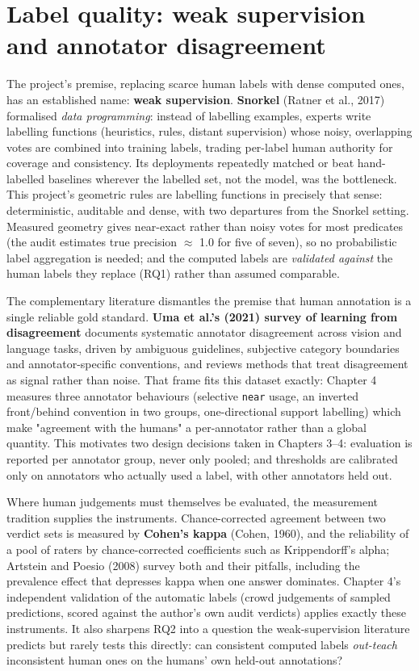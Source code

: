 \section{Label quality: weak supervision and annotator disagreement}

The project's premise, replacing scarce human labels with dense computed ones, has an established name: \textbf{weak supervision}. \textbf{Snorkel} (Ratner et al., 2017) formalised \textit{data programming}: instead of labelling examples, experts write labelling functions (heuristics, rules, distant supervision) whose noisy, overlapping votes are combined into training labels, trading per-label human authority for coverage and consistency. Its deployments repeatedly matched or beat hand-labelled baselines wherever the labelled set, not the model, was the bottleneck. This project's geometric rules are labelling functions in precisely that sense: deterministic, auditable and dense, with two departures from the Snorkel setting. Measured geometry gives near-exact rather than noisy votes for most predicates (the audit estimates true precision $\approx$ 1.0 for five of seven), so no probabilistic label aggregation is needed; and the computed labels are \textit{validated against} the human labels they replace (RQ1) rather than assumed comparable.

The complementary literature dismantles the premise that human annotation is a single reliable gold standard. \textbf{Uma et al.'s (2021) survey of learning from disagreement} documents systematic annotator disagreement across vision and language tasks, driven by ambiguous guidelines, subjective category boundaries and annotator-specific conventions, and reviews methods that treat disagreement as signal rather than noise. That frame fits this dataset exactly: Chapter 4 measures three annotator behaviours (selective \texttt{near} usage, an inverted front/behind convention in two groups, one-directional support labelling) which make "agreement with the humans" a per-annotator rather than a global quantity. This motivates two design decisions taken in Chapters 3--4: evaluation is reported per annotator group, never only pooled; and thresholds are calibrated only on annotators who actually used a label, with other annotators held out.

Where human judgements must themselves be evaluated, the measurement tradition supplies the instruments. Chance-corrected agreement between two verdict sets is measured by \textbf{Cohen's kappa} (Cohen, 1960), and the reliability of a pool of raters by chance-corrected coefficients such as Krippendorff's alpha; Artstein and Poesio (2008) survey both and their pitfalls, including the prevalence effect that depresses kappa when one answer dominates. Chapter 4's independent validation of the automatic labels (crowd judgements of sampled predictions, scored against the author's own audit verdicts) applies exactly these instruments. It also sharpens RQ2 into a question the weak-supervision literature predicts but rarely tests this directly: can consistent computed labels \textit{out-teach} inconsistent human ones on the humans' own held-out annotations?

